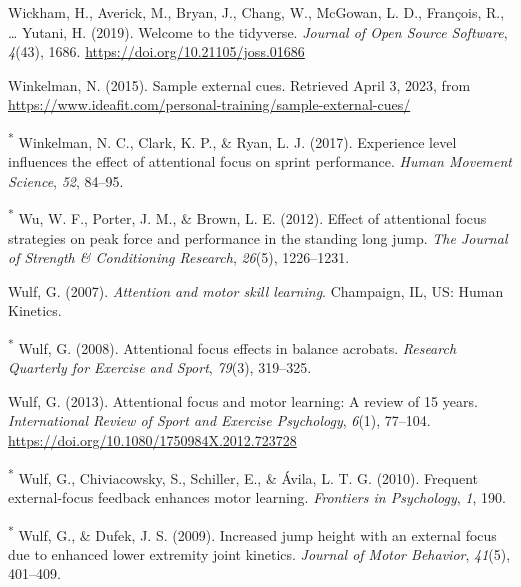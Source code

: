 \documentclass[
  man, donotrepeattitle,floatsintext]{apa7}
\newlength{\cslhangindent}
\newlength{\cslentryspacingunit} %
\newenvironment{CSLReferences}[2] %
 {%
  \setlength{\parindent}{0pt}
  \ifodd #1
  \let\oldpar\par
  \def\par{\hangindent=\cslhangindent\oldpar}
  \fi
  \setlength{\parskip}{#2\cslentryspacingunit}
 }%
 {}
\begin{document}
\begin{CSLReferences}{1}{0}
\leavevmode{}%
Wickham, H., Averick, M., Bryan, J., Chang, W., McGowan, L. D., François, R., \ldots{} Yutani, H. (2019). Welcome to the {tidyverse}. \emph{Journal of Open Source Software}, \emph{4}(43), 1686. \url{https://doi.org/10.21105/joss.01686}

\leavevmode{}%
Winkelman, N. (2015). Sample external cues. Retrieved April 3, 2023, from \url{https://www.ideafit.com/personal-training/sample-external-cues/}

\leavevmode{}%
\textsuperscript{*} Winkelman, N. C., Clark, K. P., \& Ryan, L. J. (2017). Experience level influences the effect of attentional focus on sprint performance. \emph{Human Movement Science}, \emph{52}, 84--95.

\leavevmode{}%
\textsuperscript{*} Wu, W. F., Porter, J. M., \& Brown, L. E. (2012). Effect of attentional focus strategies on peak force and performance in the standing long jump. \emph{The Journal of Strength \& Conditioning Research}, \emph{26}(5), 1226--1231.

\leavevmode{}%
Wulf, G. (2007). \emph{Attention and motor skill learning}. {Champaign, IL, US}: {Human Kinetics}.

\leavevmode{}%
\textsuperscript{*} Wulf, G. (2008). Attentional focus effects in balance acrobats. \emph{Research Quarterly for Exercise and Sport}, \emph{79}(3), 319--325.

\leavevmode{}%
Wulf, G. (2013). Attentional focus and motor learning: A review of 15 years. \emph{International Review of Sport and Exercise Psychology}, \emph{6}(1), 77--104. \url{https://doi.org/10.1080/1750984X.2012.723728}

\leavevmode{}%
\textsuperscript{*} Wulf, G., Chiviacowsky, S., Schiller, E., \& Ávila, L. T. G. (2010). Frequent external-focus feedback enhances motor learning. \emph{Frontiers in Psychology}, \emph{1}, 190.

\leavevmode{}%
\textsuperscript{*} Wulf, G., \& Dufek, J. S. (2009). Increased jump height with an external focus due to enhanced lower extremity joint kinetics. \emph{Journal of Motor Behavior}, \emph{41}(5), 401--409.


\end{CSLReferences}
\end{document}
